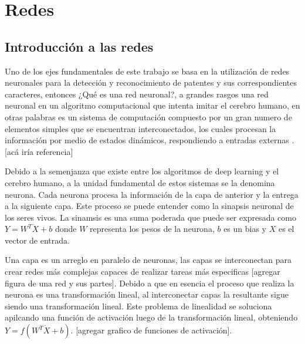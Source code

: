 \section{Redes}

\subsection{Introducción a las redes}

Uno de los ejes fundamentales de este trabajo se basa en la utilización de redes neuronales para la detección y reconocimiento de patentes 
y sus correspondientes caracteres, entonces ¿Qué es una red neuronal?, a grandes rasgos una red neuronal en un algoritmo computacional que 
intenta imitar el cerebro humano, en otras palabras es un sistema de computación compuesto por un gran numero de elementos simples que se 
encuentran interconectados, los cuales procesan la información por medio de estados dinámicos, respondiendo a entradas externas
.[acá iría referencia]

Debido a la semenjanza que existe entre los algoritmos de deep learning y el cerebro humano, a la unidad fundamental de estos sistemas se la
 denomina neurona.
Cada neurona procesa la información de la capa de anterior y la entrega a la siguiente capa. Este proceso se puede entender como la sinapsis 
neuronal de los seres vivos.
La sinamsis es una suma poderada que puede ser expresada como $Y = W^T\dot X + b$ donde $W$ representa los pesos de la neurona, $b$ es un bias 
y $X$ es el vector de entrada.

Una capa es un arreglo en paralelo de neuronas, las capas se interconectan para crear redes más complejas capaces de realizar tareas más 
especificas [agregar figura de una red y sus partes].
Debido a que en esencia el proceso que realiza la neurona es una transformación lineal, al interconectar capas la resultante sigue siendo 
una transformación lineal. Este problema de linealidad se soluciona apilcando una función de activación luego de la transformación lineal, 
obteniendo $Y=f(W^T \dot X + b)$. [agregar grafico de funciones de activación].

